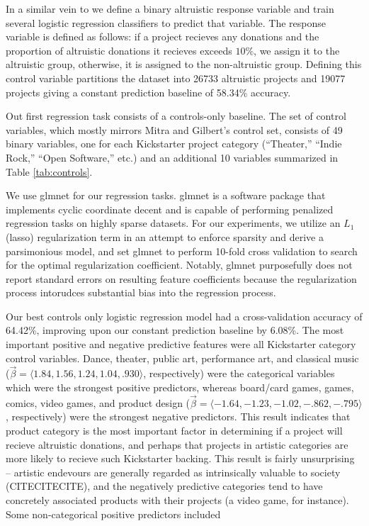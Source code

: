 \documentclass[letterpaper]{article}
\begin{document}
In a similar vein to \cite{mitra2014language} we define a binary altruistic response variable and train several logistic regression classifiers to predict that variable. The response variable is defined as follows: if a project recieves any donations and the proportion of altruistic donations it recieves exceeds $10\%$, we assign it to the altruistic group, otherwise, it is assigned to the non-altruistic group. Defining this control variable partitions the dataset into 26733 altruistic projects and 19077 projects giving a constant prediction baseline of 58.34\% accuracy.

Out first regression task consists of a controls-only baseline. The set of control variables, which mostly mirrors Mitra and Gilbert's control set, consists of 49 binary variables, one for each Kickstarter project category (``Theater,'' ``Indie Rock,'' ``Open Software,'' etc.) and an additional 10 variables summarized in Table \ref{tab:controls}.

We use glmnet \cite{friedman2010glmnet} for our regression tasks. glmnet is a software package that implements cyclic coordinate decent and is capable of performing penalized regression tasks on highly sparse datasets. For our experiments, we utilize an $L_1$ (lasso) regularization term in an attempt to enforce sparsity and derive a parsimonious model, and set glmnet to perform 10-fold cross validation to search for the optimal regularization coefficient. Notably, glmnet purposefully does not report standard errors on resulting feature coefficients because the regularization process intorudces substantial bias into the regression process.

Our best controls only logistic regression model had a cross-validation accuracy of 64.42\%, improving upon our constant prediction baseline by 6.08\%. The most important positive and negative predictive features were all Kickstarter category control variables. Dance, theater, public art, performance art, and classical music ($\vec{\beta} = \langle 1.84, 1.56, 1.24, 1.04, .930 \rangle$, respectively) were the categorical variables which were the strongest positive predictors, whereas board/card games, games, comics, video games, and product design ($\vec{\beta} = \langle -1.64, -1.23, -1.02, -.862, -.795 \rangle$, respectively) were the strongest negative predictors. This result indicates that product category is the most important factor in determining if a project will recieve altruistic donations, and perhaps that projects in artistic categories are more likely to recieve such Kickstarter backing. This result is fairly unsurprising -- artistic endevours are generally regarded as intrinsically valuable to society (CITECITECITE), and the negatively predictive categories tend to have concretely associated products with their projects (a video game, for instance). Some non-categorical positive predictors included
\end{document}
